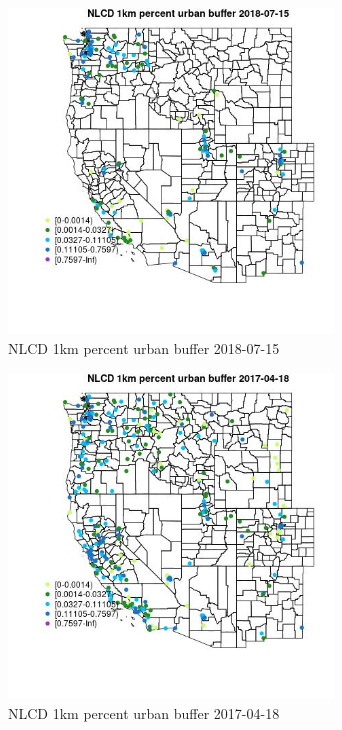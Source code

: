 \begin{figure} 
\centering  
\includegraphics[width=0.77\textwidth]{Code_Outputs/Report_ML_input_PM25_Step4_part_e_de_duplicated_aves_compiled_2019-05-20wNAs_MapObsNLCD_1km_percent_urban_buffer2018-07-15.jpg} 
\caption{\label{fig:Report_ML_input_PM25_Step4_part_e_de_duplicated_aves_compiled_2019-05-20wNAsMapObsNLCD_1km_percent_urban_buffer2018-07-15}NLCD 1km percent urban buffer 2018-07-15} 
\end{figure} 
 

\begin{figure} 
\centering  
\includegraphics[width=0.77\textwidth]{Code_Outputs/Report_ML_input_PM25_Step4_part_e_de_duplicated_aves_compiled_2019-05-20wNAs_MapObsNLCD_1km_percent_urban_buffer2017-04-18.jpg} 
\caption{\label{fig:Report_ML_input_PM25_Step4_part_e_de_duplicated_aves_compiled_2019-05-20wNAsMapObsNLCD_1km_percent_urban_buffer2017-04-18}NLCD 1km percent urban buffer 2017-04-18} 
\end{figure} 
 

